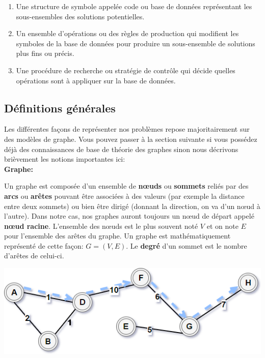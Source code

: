 \begin{enumerate}
\item Une structure de symbole appelée code ou base de données représentant les sous-ensembles des solutions potentielles.
\item Un ensemble d'opérations ou des règles de production qui modifient les symboles de la base de données pour produire un sous-ensemble de solutions plus fins ou précis.
\item Une procédure de recherche ou stratégie de contrôle qui décide quelles opérations sont à appliquer sur la base de données.
\end{enumerate}

\subsection{Définitions générales}
Les différentes façons de représenter nos problèmes repose majoritairement sur des modèles de graphe. Vous pouvez passer à la section suivante si vous possédez déjà des connaissances de base de théorie des graphes sinon nous décrivons brièvement les notions importantes ici:\\

{\setlength{\parindent}{0cm}\textbf{Graphe:}}

Un graphe est composée d'un ensemble de \textbf{nœuds} ou \textbf{sommets} reliés par des \textbf{arcs} ou \textbf{arêtes} pouvant être associées à des valeurs (par exemple la distance entre deux sommets) ou bien être dirigé (donnant la direction, on va d'un nœud à l'autre).
Dans notre cas, nos graphes auront toujours un nœud de départ appelé \textbf{nœud racine}.
L'ensemble des nœuds est le plus souvent noté $V$ et on note $E$ pour l'ensemble des arêtes du graphe. 
Un graphe est mathématiquement représenté de cette façon: $G = (V, E)$.
Le \textbf{degré} d'un sommet est le nombre d'arêtes de celui-ci.\\

\begin{center}
    \includegraphics[scale=0.6]{../ressources/images/example_graph.png}
\end{center}

